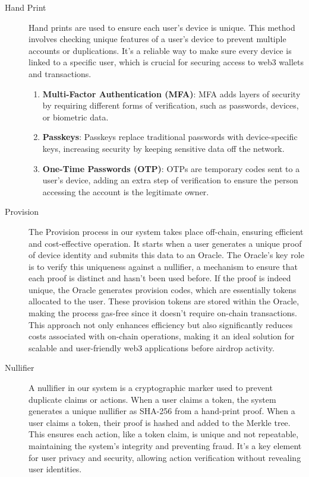 \documentclass[12pt,oneside]{article}
\begin{document}
\begin{description}
  \item[Hand Print] 
  Hand prints are used to ensure each user's device is unique. This method involves checking unique features of a user's device to prevent multiple accounts or duplications. It's a reliable way to make sure every device is linked to a specific user, which is crucial for securing access to web3 wallets and transactions. 
  
  \begin{enumerate}
      \item \textbf{Multi-Factor Authentication (MFA)}: MFA adds layers of security by requiring different forms of verification, such as passwords, devices, or biometric data.
      \item \textbf{Passkeys}: Passkeys replace traditional passwords with device-specific keys, increasing security by keeping sensitive data off the network.
      \item \textbf{One-Time Passwords (OTP)}: OTPs are temporary codes sent to a user's device, adding an extra step of verification to ensure the person accessing the account is the legitimate owner.
  \end{enumerate}  

  \item[Provision]
  The Provision process in our system takes place off-chain, ensuring
  efficient and cost-effective operation. It starts when a user generates a unique proof of
  device identity and submits this data to an Oracle. The Oracle's key role is to verify this uniqueness 
  against a nullifier, a mechanism to ensure that each proof is distinct and hasn't been used before. 
  If the proof is indeed unique, the Oracle generates provision codes, which are essentially tokens allocated 
  to the user. These provision tokens are stored within the Oracle, making the process gas-free since it doesn't require
  on-chain transactions. This approach not only enhances efficiency but also significantly reduces costs associated with
  on-chain operations, making it an ideal solution for scalable and user-friendly web3 applications before airdrop activity.

  \item[Nullifier]
  A nullifier in our system is a cryptographic marker used to 
  prevent duplicate claims or actions. When a user claims a token,
  the system generates a unique nullifier as SHA-256 from a hand-print proof. When a user claims a token, their proof is hashed and added to the Merkle tree.
  This ensures each action, like a token claim, is unique and not repeatable,
  maintaining  the system's integrity and preventing fraud. 
  It's a key element for user privacy and security, allowing action verification without revealing user identities.


\end{description}
\end{document}
